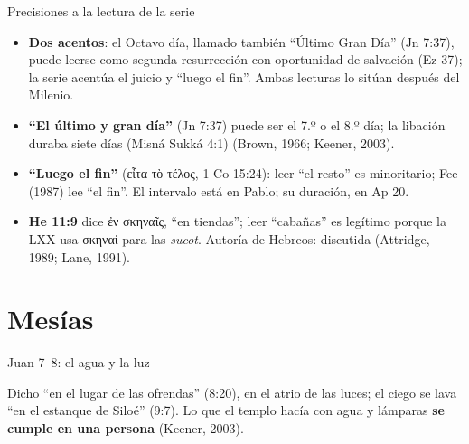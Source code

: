 \documentclass[hyperref={bookmarks=false},aspectratio=169]{beamer}
\newcommand{\grc}[1]{\foreignlanguage{ancientgreek}{#1}}
\newcommand{\destacar}[1]{\textbf{\textcolor{tierraroja}{#1}}}
\begin{document}
\begin{frame}{Precisiones a la lectura de la serie}
\scriptsize
\begin{itemize}
\item \textbf{Dos acentos}: el Octavo día, llamado también ``Último Gran Día'' (Jn 7:37), puede leerse como segunda resurrección con oportunidad de salvación (Ez 37); la serie acentúa el juicio y ``luego el fin''. Ambas lecturas lo sitúan después del Milenio.
\item \textbf{``El último y gran día''} (Jn 7:37) puede ser el 7.º o el 8.º día; la libación duraba siete días (Misná Sukká 4:1) (Brown, 1966; Keener, 2003).
\item \textbf{``Luego el fin''} (\grc{εἶτα τὸ τέλος}, 1 Co 15:24): leer ``el resto'' es minoritario; Fee (1987) lee ``el fin''. El intervalo está en Pablo; su duración, en Ap 20.
\item \textbf{He 11:9} dice \grc{ἐν σκηναῖς}, ``en tiendas''; leer ``cabañas'' es legítimo porque la LXX usa \grc{σκηναί} para las \emph{sucot}. Autoría de Hebreos: discutida (Attridge, 1989; Lane, 1991).
\end{itemize}
\end{frame}

\section{Mesías}

\begin{frame}{Juan 7--8: el agua y la luz}
\centering
{}\par\medskip
\scriptsize Dicho ``en el lugar de las ofrendas'' (8:20), en el atrio de las luces; el ciego se lava ``en el estanque de Siloé'' (9:7). Lo que el templo hacía con agua y lámparas \destacar{se cumple en una persona} (Keener, 2003).
\end{frame}
\end{document}
